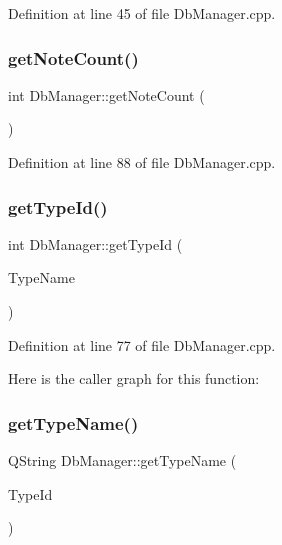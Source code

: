 Definition at line 45 of file Db\+Manager.\+cpp.

\hypertarget{classDbManager_ae3998b50545d88a27d4361053f39b050}{}\label{classDbManager_ae3998b50545d88a27d4361053f39b050} 
\subsubsection{\texorpdfstring{get\+Note\+Count()}{getNoteCount()}}
{\footnotesize\ttfamily int Db\+Manager\+::get\+Note\+Count (\begin{DoxyParamCaption}{ }\end{DoxyParamCaption})\hspace{0.3cm}{\ttfamily [static]}}



Definition at line 88 of file Db\+Manager.\+cpp.

\hypertarget{classDbManager_a92ebefd0d5fae643db1fc51cc7ea0c31}{}\label{classDbManager_a92ebefd0d5fae643db1fc51cc7ea0c31} 
\subsubsection{\texorpdfstring{get\+Type\+Id()}{getTypeId()}}
{\footnotesize\ttfamily int Db\+Manager\+::get\+Type\+Id (\begin{DoxyParamCaption}\item[{const Q\+String \&}]{Type\+Name }\end{DoxyParamCaption})\hspace{0.3cm}{\ttfamily [static]}}



Definition at line 77 of file Db\+Manager.\+cpp.

Here is the caller graph for this function\+:
\hypertarget{classDbManager_a6cb58e12049873e8b1b4b6ecd74dbfb6}{}\label{classDbManager_a6cb58e12049873e8b1b4b6ecd74dbfb6} 
\subsubsection{\texorpdfstring{get\+Type\+Name()}{getTypeName()}}
{\footnotesize\ttfamily Q\+String Db\+Manager\+::get\+Type\+Name (\begin{DoxyParamCaption}\item[{int}]{Type\+Id }\end{DoxyParamCaption})\hspace{0.3cm}{\ttfamily [static]}}



